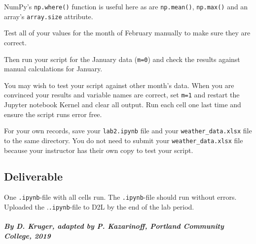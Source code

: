 \documentclass[11pt]{article}
\begin{document}
NumPy's \texttt{np.where()} function is useful here as are
\texttt{np.mean()}, \texttt{np.max()} and an array's \texttt{array.size}
attribute.

    Test all of your values for the month of February manually to make sure
they are correct.

Then run your script for the January data (\texttt{m=0}) and check the
results against manual calculations for January.

You may wish to test your script against other month's data. When you
are convinced your results and variable names are correct, set
\texttt{m=1} and restart the Jupyter notebook Kernel and clear all
output. Run each cell one last time and ensure the script runs error
free.

For your own records, save your \texttt{lab2.ipynb} file and your
\texttt{weather\_data.xlsx} file to the same directory. You do not need
to submit your \texttt{weather\_data.xlsx} file because your instructor
has their own copy to test your script.

    \hypertarget{deliverable}{%
\subsection{Deliverable}\label{deliverable}}

One \texttt{.ipynb}-file with all cells run. The \texttt{.ipynb}-file
should run without errors. Uploaded the .\texttt{.ipynb}-file to D2L by
the end of the lab period.

    \hypertarget{by-d.-kruger-adapted-by-p.-kazarinoff-portland-community-college-2019}{%
\paragraph{\texorpdfstring{\emph{By D. Kruger, adapted by P. Kazarinoff,
Portland Community College,
2019}}{By D. Kruger, adapted by P. Kazarinoff, Portland Community College, 2019}}\label{by-d.-kruger-adapted-by-p.-kazarinoff-portland-community-college-2019}}


    
    
    
    
\end{document}
